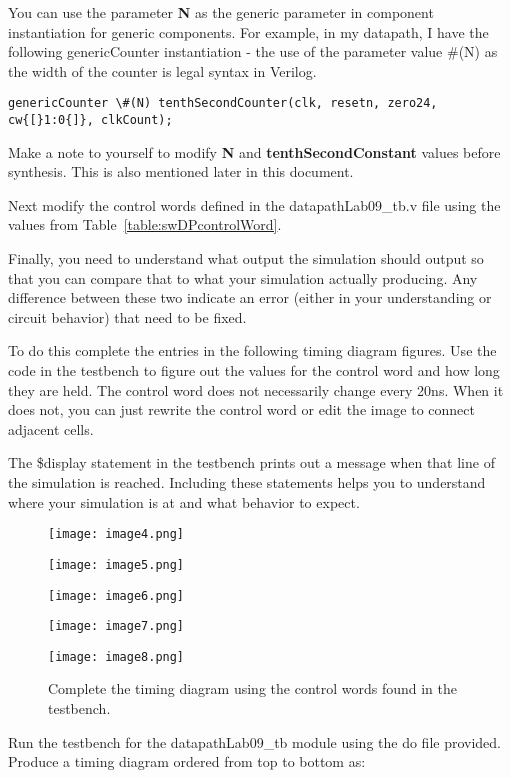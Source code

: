 \begin{Figure}
You can use the parameter \textbf{N} as the generic parameter in
component instantiation for generic components. For example, in my
datapath, I have the following genericCounter instantiation - the use of
the parameter value \#(N) as the width of the counter is legal syntax in
Verilog.

\begin{verbatim}
genericCounter \#(N) tenthSecondCounter(clk, resetn, zero24,
cw{[}1:0{]}, clkCount);
\end{verbatim}

Make a note to yourself to modify \textbf{N} and
\textbf{tenthSecondConstant} values before synthesis. This is also
mentioned later in this document.

Next modify the control words defined in the datapathLab09\_tb.v file
using the values from Table~\ref{table:swDPcontrolWord}.

Finally, you need to understand what output the simulation should output
so that you can compare that to what your simulation actually producing.
Any difference between these two indicate an error (either in your
understanding or circuit behavior) that need to be fixed.

To do this complete the entries in the following timing diagram figures.
Use the code in the testbench to figure out the values for the control
word and how long they are held. The control word does not necessarily
change every 20ns. When it does not, you can just rewrite the control
word or edit the image to connect adjacent cells.

The \$display statement in the testbench prints out a message when that
line of the simulation is reached. Including these statements helps you
to understand where your simulation is at and what behavior to expect.

\begin{landscape}
\begin{figure}
\texttt{[image:  image4.png]}

\texttt{[image:  image5.png]}

\texttt{[image:  image6.png]}

\texttt{[image:  image7.png]}

\texttt{[image:  image8.png]}
\caption{Complete the timing diagram using the control words found in the testbench.}
\label{figure:swDPtiming}
\end{figure}

\end{landscape}

Run the testbench for the datapathLab09\_tb module using the do file
provided. Produce a timing diagram ordered from top to bottom as:


\end{Figure}
